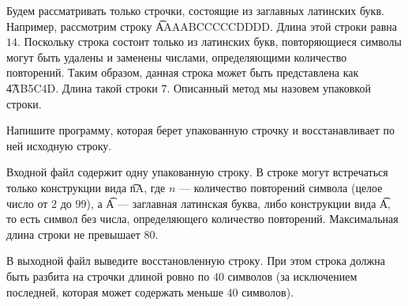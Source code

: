 Будем рассматривать только строчки, состоящие из заглавных латинских букв. Например, рассмотрим строку \t{AAAABCCCCCDDDD}. Длина этой строки равна $14$. Поскольку строка состоит только из латинских букв, повторяющиеся символы могут быть удалены и заменены числами, определяющими количество повторений. Таким образом, данная строка может быть представлена как \t{4AB5C4D}. Длина такой строки $7$. Описанный метод мы назовем упаковкой строки. 

Напишите программу, которая берет упакованную строчку и восстанавливает по ней исходную строку. 


\InputFile

Входной файл содержит одну упакованную строку. В строке могут встречаться только конструкции вида \t{nA}, где $n$ --- количество повторений символа (целое число от $2$ до $99$), а \t{A} --- заглавная латинская буква, либо конструкции вида \t{A}, то есть символ без числа, определяющего количество повторений. Максимальная длина строки не превышает $80$.

\OutputFile

В выходной файл выведите восстановленную строку. При этом строка должна быть разбита на строчки длиной ровно по $40$ символов (за исключением последней, которая может содержать меньше $40$ символов). 

\SAMPLES

